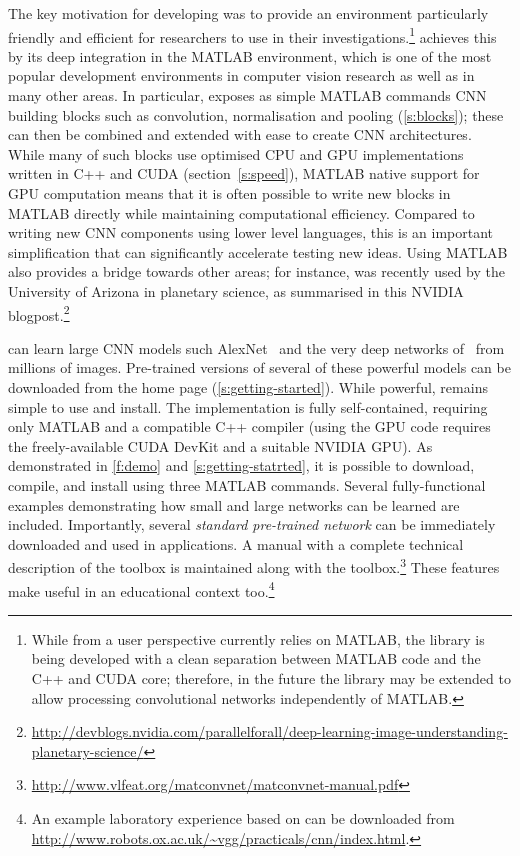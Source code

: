 The key motivation for developing \matconvnet was to provide an environment particularly friendly and efficient for researchers to use in their investigations.\footnote{While from a user perspective \matconvnet currently relies on MATLAB, the library is being developed with a clean separation between MATLAB code and the C++ and CUDA core; therefore, in the future the library may be extended to allow processing convolutional networks independently of MATLAB.} \matconvnet achieves this by its deep integration in the MATLAB environment, which is one of the most popular development environments in computer vision research as well as in many other areas. In particular, \matconvnet exposes as simple MATLAB commands CNN building blocks such as convolution, normalisation and pooling (\autoref{s:blocks}); these can then be combined and extended with ease to create CNN architectures. While many of such blocks use optimised CPU and GPU implementations written in C++ and CUDA (section~\autoref{s:speed}), MATLAB native support for GPU computation means that it is often possible to write new blocks in MATLAB directly while maintaining computational efficiency. Compared to writing new CNN components using lower level languages, this is an important simplification that can significantly accelerate testing new ideas. Using MATLAB also provides a bridge towards other areas; for instance, \matconvnet was recently used by the University of Arizona in planetary science, as summarised in this NVIDIA blogpost.\footnote{\small\url{http://devblogs.nvidia.com/parallelforall/deep-learning-image-understanding-planetary-science/}}

\matconvnet can learn large CNN models such AlexNet~\cite{krizhevsky12imagenet} and the very deep networks of~\cite{simonyan14deep} from millions of images. Pre-trained versions of several of these powerful models can be downloaded from  the \matconvnet home page (\autoref{s:getting-started}). While powerful, \matconvnet remains simple to use and install. The implementation is fully self-contained, requiring only MATLAB and a compatible C++ compiler (using the GPU code requires the freely-available CUDA DevKit and a suitable NVIDIA GPU). As demonstrated in \autoref{f:demo} and \autoref{s:getting-statrted}, it is possible to download, compile, and install \matconvnet using three MATLAB commands. Several fully-functional examples demonstrating how small and large networks can be learned are included. Importantly, several \emph{standard pre-trained network} can be immediately downloaded and used in applications. A manual with a complete technical description of the toolbox is maintained along with the toolbox.\footnote{\small\url{http://www.vlfeat.org/matconvnet/matconvnet-manual.pdf}} These features make \matconvnet useful in an educational context too.\footnote{An example laboratory experience based on \matconvnet can be downloaded from {\small\url{http://www.robots.ox.ac.uk/~vgg/practicals/cnn/index.html}}.}

